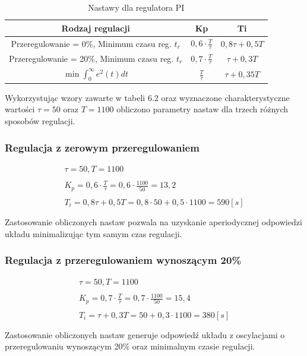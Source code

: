 \documentclass[oneside]{mgr}
\begin{document}
\begin{table}[h!]
\begin{tabularx}{\textwidth}{|c|c|c|}
\hline
\rowcolor{lightgray}
Rodzaj regulacji & Kp & Ti \\ \hline
\multirow{2}{*}{Przeregulowanie = 0\%,  Minimum czasu reg. $t_r$ } & \multirow{2}{*}{$0,6 \cdot \frac{T}{\tau}$} & \multirow{2}{*}{$0,8\tau + 0,5T$} \\
 & &\\\hline
\multirow{2}{*}{Przeregulowanie = 20\%,  Minimum czasu reg. $t_r$ } & \multirow{2}{*}{$0,7 \cdot \frac{T}{\tau}$} & \multirow{2}{*}{$\tau + 0,3T$} \\
 & &\\ \hline
\multirow{2}{*}{$\min \int_{0}^{\infty}e^{2}(t)dt$} & \multirow{2}{*}{$\frac{T}{\tau}$} & \multirow{2}{*}{$\tau + 0,35T$} \\
 & &\\ \hline
\end{tabularx}
   \caption{Nastawy dla regulatora PI}
\end{table}

Wykorzystując wzory zawarte w tabeli 6.2 oraz wyznaczone charakterystyczne wartości $\tau = 50$ oraz $T = 1100$ obliczono parametry nastaw dla trzech różnych sposobów regulacji.

\subsubsection{Regulacja z zerowym przeregulowaniem}
    \begin{equation*}
    \begin{array}{c}
     \tau = 50, T = 1100 \\ \\
    K_{p} = 0,6 \cdot \frac{T}{\tau} = 0,6 \cdot \frac{1100}{50} = 13,2 \\ \\
    T_{i} = 0,8\tau + 0,5T = 0,8 \cdot 50 + 0,5 \cdot 1100 = 590[s]\\ \\
    \end{array}
    \end{equation*}
    Zastosowanie obliczonych nastaw pozwala na uzyskanie aperiodycznej odpowiedzi układu minimalizując tym samym czas regulacji.
\subsubsection{Regulacja z przeregulowaniem wynoszącym 20\%}
    \begin{equation*}
    \begin{array}{c}
     \tau = 50, T = 1100 \\ \\
    K_{p} = 0,7 \cdot \frac{T}{\tau} = 0,7 \cdot \frac{1100}{50} = 15,4 \\ \\
    T_{i} = \tau + 0,3T = 50 + 0,3 \cdot 1100 = 380[s]\\ \\
    \end{array}
    \end{equation*}
    Zastosowanie obliczonych nastaw generuje odpowiedź układu z oscylacjami o przeregulowaniu wynoszącym 20\% oraz minimalnym czasie regulacji.
\end{document}

